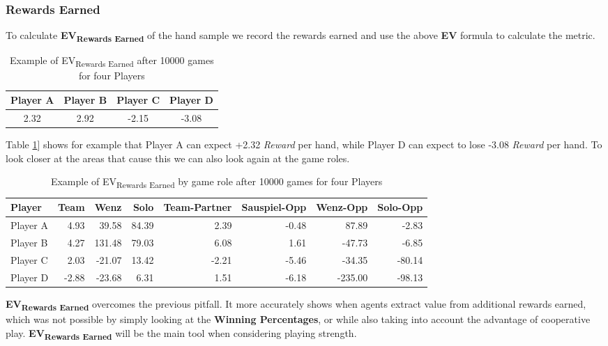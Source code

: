 \subsubsection{Rewards Earned}
To calculate \textbf{EV\textsubscript{Rewards Earned}} of the hand sample we record the rewards earned and use the
above \textbf{EV} formula to calculate the metric.
\newline
\begin{center}
\begin{table}[h!]
\begin{tabular}{cccc}
\toprule
Player A &  Player B &  Player C &  Player D\\
\midrule
2.32 &              2.92 &          -2.15 &          -3.08 \\
\bottomrule
\end{tabular}
\caption{Example of EV\textsubscript{Rewards Earned} after 10000 games for four Players}
\label{tab:EVrewardsOverall}
\end{table}
\end{center}
Table \ref{tab:EVrewardsOverall}] shows for example that Player A can expect +2.32 \textit{Reward} per hand, while
Player D can expect to lose -3.08 \textit{Reward} per hand.
To look closer at the areas that cause this we can also look again at the game roles.
\newline
\begin{center}
\begin{table}[h!]
\begin{tabular}{lrrrrrrr}
\toprule
Player &  Team &    Wenz &   Solo &  Team-Partner &  Sauspiel-Opp &  Wenz-Opp &  Solo-Opp \\
\midrule
Player A &  4.93 &   39.58 &  84.39 &          2.39 &         -0.48 &     87.89 &     -2.83 \\
Player B &  4.27 &  131.48 &  79.03 &          6.08 &          1.61 &    -47.73 &     -6.85 \\
Player C &  2.03 &  -21.07 &  13.42 &         -2.21 &         -5.46 &    -34.35 &    -80.14 \\
Player D & -2.88 &  -23.68 &   6.31 &          1.51 &         -6.18 &   -235.00 &    -98.13 \\
\bottomrule
\end{tabular}
    \caption{Example of EV\textsubscript{Rewards Earned} by game role after 10000 games for four Players}
\label{tab:EVrewardsGamemode}
\end{table}
\end{center}
\textbf{EV\textsubscript{Rewards Earned}} overcomes the previous pitfall.
It more accurately shows when agents extract value from additional rewards earned, which was not possible by simply
looking at the \textbf{Winning Percentages}, or while also taking into account the advantage of cooperative play.
\newline
\textbf{EV\textsubscript{Rewards Earned}} will be the main tool when considering playing strength.

